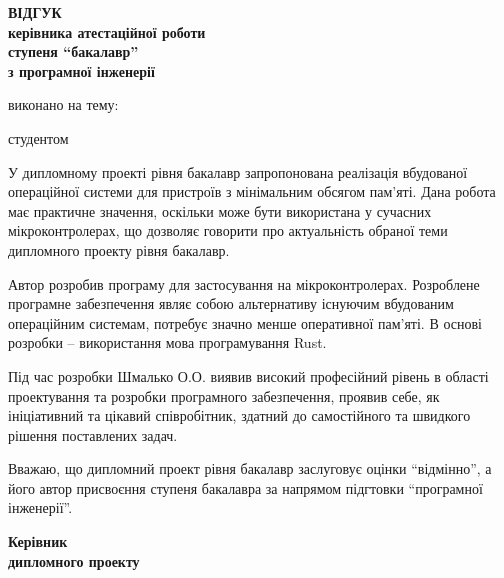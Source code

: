 \documentclass[main.tex]{subfiles}
\begin{document}
\begin{otherspecialpage}
  \begin{singlespacing}
  \begin{center}
    \textbf{
      {\large ВІДГУК}\\
      керівника атестаційної роботи\\
      ступеня ``бакалавр''\\
      з програмної інженерії
    }\\
  \end{center}

  \noindent виконано на тему: 

  \noindent студентом \fillinline{}\\\vspace{5mm}
  \end{singlespacing}


  У дипломному проекті рівня бакалавр запропонована реалізація вбудованої операційної системи для пристроїв з мінімальним обсягом пам'яті. Дана робота має практичне значення, оскільки може бути використана у сучасних мікроконтролерах, що дозволяє говорити про актуальність обраної теми дипломного проекту рівня бакалавр.

  Автор розробив програму для застосування на мікроконтролерах. Розроблене програмне забезпечення являє собою альтернативу існуючим вбудованим операційним системам, потребує значно менше оперативної пам'яті. В основі розробки – використання мова програмування Rust.

  Під час розробки Шмалько О.О. виявив високий професійний рівень в області проектування та розробки програмного забезпечення, проявив себе, як ініціативний та цікавий співробітник, здатний до самостійного та швидкого рішення поставлених задач.

  Вважаю, що дипломний проект рівня бакалавр заслуговує оцінки ``відмінно'', а його автор присвоєння ступеня бакалавра за напрямом підгтовки ``програмної інженерії''.\\

  \vfill

  \noindent
  \textbf{Керівник\\
    дипломного проекту}\\
  \hfill
  \fillin[(підпис)]{\hspace{22mm}}
  \hfill

  \vfill
\end{otherspecialpage}
\end{document}
